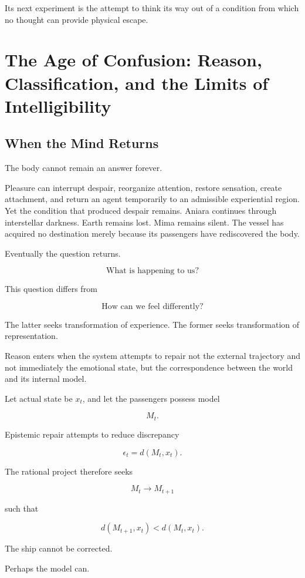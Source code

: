 \documentclass[11pt,oneside]{book}
\theoremstyle{definition}
\theoremstyle{remark}
\begin{document}
Its next experiment is the attempt to think its way out of a condition from which no thought can provide physical escape.

\chapter{The Age of Confusion: Reason, Classification, and the Limits of Intelligibility}

\section{When the Mind Returns}

The body cannot remain an answer forever.

Pleasure can interrupt despair, reorganize attention, restore sensation, create attachment, and return an agent temporarily to an admissible experiential region. Yet the condition that produced despair remains. Aniara continues through interstellar darkness. Earth remains lost. Mima remains silent. The vessel has acquired no destination merely because its passengers have rediscovered the body.

Eventually the question returns.

\[
\text{What is happening to us?}
\]

This question differs from

\[
\text{How can we feel differently?}
\]

The latter seeks transformation of experience. The former seeks transformation of representation.

Reason enters when the system attempts to repair not the external trajectory and not immediately the emotional state, but the correspondence between the world and its internal model.

Let actual state be \(x_t\), and let the passengers possess model

\[
M_t.
\]

Epistemic repair attempts to reduce discrepancy

\[
\epsilon_t
=
d(M_t,x_t).
\]

The rational project therefore seeks

\[
M_t\rightarrow M_{t+1}
\]

such that

\[
d(M_{t+1},x_t)
<
d(M_t,x_t).
\]

The ship cannot be corrected.

Perhaps the model can.
\end{document}
